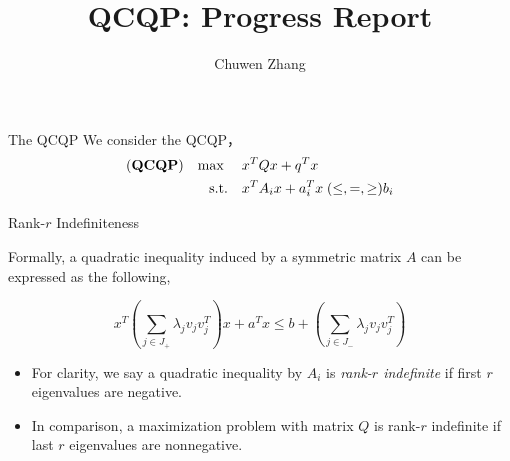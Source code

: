 \documentclass[aspectratio=1610, 10pt]{beamer}
\newcommand{\model}[1]{(\textbf{#1})}
\newcommand{\mx}{\mathbf{\max}\;}
\begin{document}
\title{QCQP: Progress Report}

\author{
  Chuwen Zhang
}


\maketitle
\begin{frame}{The QCQP}
  We consider the QCQP，
  \begin{equation}
    \label{eq:inhoqcqp}
    \begin{aligned}
      \model{QCQP} \quad \mx \quad & x^T Qx + q^T x                                        \\
      \textrm{s.t.} \quad          & x^T A_i x + a_i^T x \hspace{0.27em} (\le, =, \ge) b_i \\
    \end{aligned}
  \end{equation}
\end{frame}
\begin{frame}[allowframebreaks]{Rank-\(r\) Indefiniteness}

  Formally, a quadratic inequality induced by a symmetric matrix \(A\) can be expressed as the following,

  \begin{equation}
    x^T \left(\sum_{j\in J_+} \lambda_j v_jv_j^T\right)x +a^Tx \le b + \left(\sum_{j\in J_-} \lambda_j v_jv_j^T\right)
  \end{equation}

  \begin{itemize}
    \item For clarity, we say a quadratic inequality by \(A_i\) is \emph{rank-\(r\) indefinite} if first \(r\) eigenvalues are negative.
    \item In comparison, a maximization problem with matrix \(Q\) is rank-\(r\) indefinite if last \(r\) eigenvalues are nonnegative.
  \end{itemize}

\end{frame}
\end{document}

